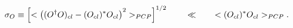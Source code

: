 \begin{equation}
\label{collective}
\sigma_O \equiv \left[ <\left((O^{\dagger} O)_{cl} - (O_{cl})^* 
O_{cl}\right)^2>_{PCP} \right]^{1/2} \hspace{0.3in} 
\ll \hspace{0.3in} <(O_{cl})^* O_{cl}>_{PCP}. 
\end{equation}

